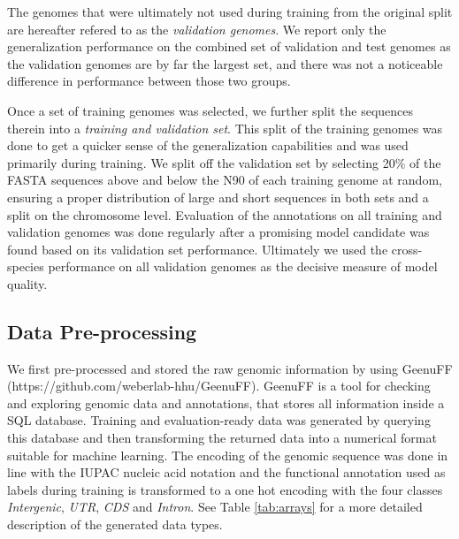 \documentclass{bioinfo}
\begin{document}
\begin{methods}
The genomes that were ultimately not used during training from the original 
split are hereafter refered to as the {\it validation genomes}. 
We report only the generalization 
performance on the combined set of validation and test genomes as the validation 
genomes are by far the largest set, and there was not a noticeable difference in 
performance between those two groups. 

Once a set of training genomes was selected, we further split the sequences therein into a {\it 
training and validation set}. This split of the training genomes was done to get a 
quicker sense of the generalization capabilities and was used primarily during 
training. We split off the validation set by selecting 20\% of the FASTA sequences 
above and below the N90 of each training genome at random, ensuring a proper distribution of 
large and short sequences in both sets and a split on the chromosome level. 
Evaluation of the annotations on all training and validation genomes was done 
regularly after a promising model candidate was found based on its validation set 
performance. Ultimately we used the cross-species performance on all 
validation genomes as the decisive measure of model quality.

\subsection{Data Pre-processing}
We first pre-processed and stored the raw genomic information by using GeenuFF 
(https://github.com/weberlab-hhu/GeenuFF). 
GeenuFF is a tool for checking and exploring genomic data and annotations, that 
stores all information inside a SQL database. Training and evaluation-ready data was
generated by querying this database and then transforming the returned data into a 
numerical format suitable for machine learning. The encoding of the genomic sequence 
was done in line with the IUPAC nucleic acid notation and the functional annotation 
used as labels during training is transformed to a one hot encoding with the four 
classes {\it Intergenic}, {\it UTR}, {\it CDS} and {\it Intron}. See Table 
\ref{tab:arrays} for a more detailed description of the generated data types.

\begin{table}[!htb]
\label{tab:arrays}
\end{table}


\end{methods}
\end{document}
